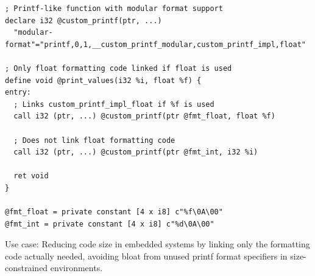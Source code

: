 \begin{lstlisting}[style=ir]
; Printf-like function with modular format support
declare i32 @custom_printf(ptr, ...)
  "modular-format"="printf,0,1,__custom_printf_modular,custom_printf_impl,float"

; Only float formatting code linked if float is used
define void @print_values(i32 %i, float %f) {
entry:
  ; Links custom_printf_impl_float if %f is used
  call i32 (ptr, ...) @custom_printf(ptr @fmt_float, float %f)

  ; Does not link float formatting code
  call i32 (ptr, ...) @custom_printf(ptr @fmt_int, i32 %i)

  ret void
}

@fmt_float = private constant [4 x i8] c"%f\0A\00"
@fmt_int = private constant [4 x i8] c"%d\0A\00"
\end{lstlisting}

Use case: Reducing code size in embedded systems by linking only the formatting code actually needed, avoiding bloat from unused printf format specifiers in size-constrained environments.
